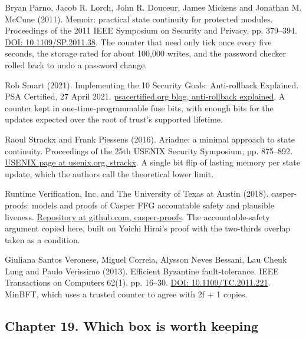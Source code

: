 \documentclass[11pt,twoside]{article}
\theoremstyle{thielethm}
\theoremstyle{thieledef}
\theoremstyle{thieledef}
\theoremstyle{thieledef}
\theoremstyle{thielethm}
\theoremstyle{thieleobs}
\theoremstyle{thielethm}
\begin{document}
\noindent Bryan Parno, Jacob R. Lorch, John R. Douceur, James Mickens and Jonathan M. McCune (2011). Memoir: practical state continuity for protected modules. Proceedings of the 2011 IEEE Symposium on Security and Privacy, pp. 379--394. \href{https://doi.org/10.1109/SP.2011.38}{DOI: 10.1109/SP.2011.38}. The counter that need only tick once every five seconds, the storage rated for about 100,000 writes, and the password checker rolled back to undo a password change.
\par\medskip

\noindent Rob Smart (2021). Implementing the 10 Security Goals: Anti-rollback Explained. PSA Certified, 27 April 2021. \href{https://www.psacertified.org/blog/anti-rollback-explained/}{psacertified.org blog, anti-rollback explained}. A counter kept in one-time-programmable fuse bits, with enough bits for the updates expected over the root of trust's supported lifetime.
\par\medskip

\noindent Raoul Strackx and Frank Piessens (2016). Ariadne: a minimal approach to state continuity. Proceedings of the 25th USENIX Security Symposium, pp. 875--892. \href{https://www.usenix.org/conference/usenixsecurity16/technical-sessions/presentation/strackx}{USENIX page at usenix.org, strackx}. A single bit flip of lasting memory per state update, which the authors call the theoretical lower limit.
\par\medskip

\noindent Runtime Verification, Inc. and The University of Texas at Austin (2018). casper-proofs: models and proofs of Casper FFG accountable safety and plausible liveness. \href{https://github.com/runtimeverification/casper-proofs}{Repository at github.com, casper-proofs}. The accountable-safety argument copied here, built on Yoichi Hirai's proof with the two-thirds overlap taken as a condition.
\par\medskip

\noindent Giuliana Santos Veronese, Miguel Correia, Alysson Neves Bessani, Lau Cheuk Lung and Paulo Verissimo (2013). Efficient Byzantine fault-tolerance. IEEE Transactions on Computers 62(1), pp. 16--30. \href{https://doi.org/10.1109/TC.2011.221}{DOI: 10.1109/TC.2011.221}. MinBFT, which uses a trusted counter to agree with 2f + 1 copies.
\par\medskip

\subsection*{Chapter 19. Which box is worth keeping}
\end{document}
